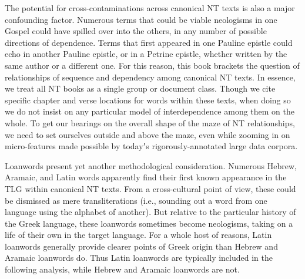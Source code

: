 The potential for cross-contaminations across canonical NT texts is also a major confounding factor. %
Numerous terms that could be viable neologisms in one Gospel could have spilled over into the others, %
in any number of possible directions of dependence. %
Terms that first appeared in one Pauline epistle could echo in another Pauline epistle, %
or in a Petrine epistle, whether written by the same author or a different one. %
For this reason, this book brackets the question of relationships of %
sequence and dependency among canonical NT texts. %
In essence, we treat all NT books as a single group or document class. %
Though we cite specific chapter and verse locations for words within these texts, %
when doing so we do not insist on any particular model of interdependence among them on the whole. %
To get our bearings on the overall shape of the maze of NT relationships, %
we need to set ourselves outside and above the maze, even while zooming in on micro-features %
made possible by todayʼs rigorously-annotated large data corpora. %

Loanwords present yet another methodological consideration. %
Numerous Hebrew, Aramaic, and Latin words apparently find their first known appearance in the TLG %
within canonical NT texts. From a cross-cultural point of view, these could be dismissed as mere transliterations %
(i.e., sounding out a word from one language using the alphabet of another). %
But relative to the particular history of the Greek language, %
these loanwords sometimes become neologisms, taking on a life of their own in the target language. %
For a whole host of reasons, Latin loanwords generally provide clearer points of Greek origin %
than Hebrew and Aramaic loanwords do. %
Thus Latin loanwords are typically included in the following analysis, %
while Hebrew and Aramaic loanwords are not. %

